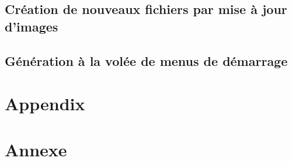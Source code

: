 \ml
{\section{\todo}}
{\section{Création de nouveaux fichiers par mise à jour d’images}}

\ml
{\section{\todo}}
{\section{Génération à la volée de menus de démarrage}}



\appendix

\ml
{\chapter{Appendix}}
{\chapter{Annexe}}
\pagebreak




\singlespacing




